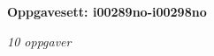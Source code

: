 \centerline{\bf Oppgavesett: i00289no-i00298no}
\vskip 10pt
\centerline{\it 10 oppgaver}\vskip 10pt
\vskip 10pt
